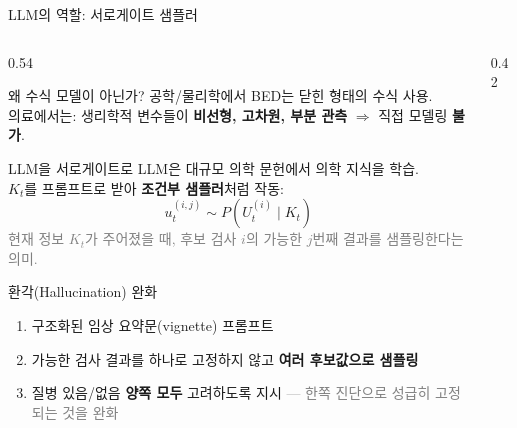 \documentclass[
11pt,notheorems,hyperref={pdfauthor=whatever}
]{beamer}
\begin{document}
\begin{frame}{LLM의 역할: 서로게이트 샘플러}
\begin{columns}[c]

\begin{column}{0.54\textwidth}

    \begin{block}{왜 수식 모델이 아닌가?}
    \footnotesize
    공학/물리학에서 BED는 닫힌 형태의 수식 사용.\\[0.3em]
    의료에서는: 생리학적 변수들이 \textbf{비선형, 고차원, 부분 관측}
    $\Rightarrow$ 직접 모델링 \textbf{불가}.
    \end{block}

    \vspace{0.3em}

    \begin{block}{LLM을 서로게이트로}
    \footnotesize
    LLM은 대규모 의학 문헌에서 의학 지식을 학습.\\[0.3em]
    $K_t$를 프롬프트로 받아 \textbf{조건부 샘플러}처럼 작동:
    \[
        u^{(i,j)}_t \sim P(U^{(i)}_t \mid K_t)
    \]
    \vspace{-0.2em}
    \scriptsize
    \textcolor{gray}{현재 정보 $K_t$가 주어졌을 때, 후보 검사 $i$의 가능한 $j$번째 결과를 샘플링한다는 의미.}
    \end{block}

    \vspace{0.3em}

    \begin{block}{환각(Hallucination) 완화}
    \footnotesize
    \begin{enumerate}\itemsep0.2em
        \item 구조화된 임상 요약문(vignette) 프롬프트
        \item 가능한 검사 결과를 하나로 고정하지 않고 \textbf{여러 후보값으로 샘플링}
        \item 질병 있음/없음 \textbf{양쪽 모두} 고려하도록 지시
            \textcolor{gray}{--- 한쪽 진단으로 성급히 고정되는 것을 완화}
    \end{enumerate}
    \end{block}

\end{column}

\begin{column}{0.42\textwidth}


\end{column}
\end{columns}
\end{frame}
\end{document}
